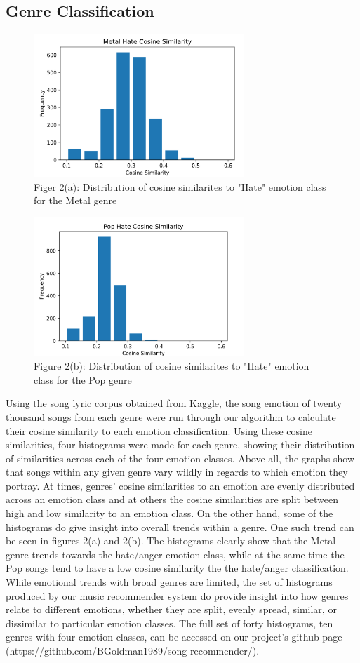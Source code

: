 \documentclass[10pt,twocolumn]{article}
\begin{document}
\subsection{Genre Classification}
\begin{figure}[!htb]
\centering
\includegraphics[width=3.125in]{metal_hate.png}
\caption{Figer 2(a): Distribution of cosine similarites to "Hate" emotion class for the Metal genre}
\label{fig:digraph}
\end{figure}
\begin{figure}[!htb]
\centering
\includegraphics[width=3.125in]{pop_hate.png}
\caption{Figure 2(b): Distribution of cosine similarites to "Hate" emotion class for the Pop genre}
\label{fig:digraph}
\end{figure}
Using the song lyric corpus obtained from Kaggle\cite{a14}, the song emotion of twenty thousand songs from each genre were run through our algorithm to calculate their cosine similarity to each emotion classification. Using these cosine similarities, four histograms were made for each genre, showing their distribution of similarities across each of the four emotion classes. Above all, the graphs show that songs within any given genre vary wildly in regards to which emotion they portray. At times, genres' cosine similarities to an emotion are evenly distributed across an emotion class and at others the cosine similarities are split between high and low similarity to an emotion class. On the other hand, some of the histograms do give insight into overall trends within a genre. One such trend can be seen in figures 2(a) and 2(b). The histograms clearly show that the Metal genre trends towards the hate/anger emotion class, while at the same time the Pop songs tend to have a low cosine similarity the the hate/anger classification. While emotional trends with broad genres are limited, the set of histograms produced by our music recommender system do provide insight into how genres relate to different emotions, whether they are split, evenly spread, similar, or dissimilar to particular emotion classes. The full set of forty histograms, ten genres with four emotion classes, can be accessed on our project's github page (https://github.com/BGoldman1989/song-recommender/).
\end{document}
